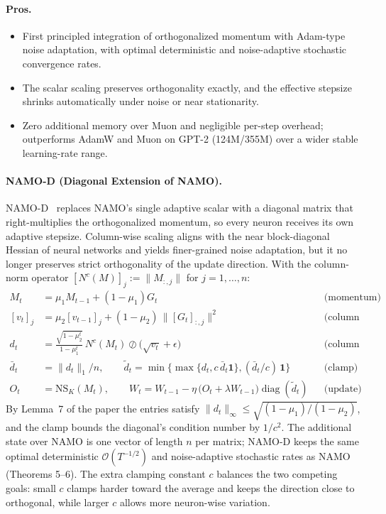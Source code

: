 \paragraph{Pros.}
\begin{itemize}[leftmargin=*]
\item First principled integration of orthogonalized momentum with Adam-type noise
  adaptation, with optimal deterministic and noise-adaptive stochastic convergence
  rates.
\item The scalar scaling preserves orthogonality exactly, and the effective stepsize
  shrinks automatically under noise or near stationarity.
\item Zero additional memory over Muon and negligible per-step overhead; outperforms
  AdamW and Muon on GPT-2 (124M/355M) over a wider stable learning-rate range.
\end{itemize}

\paragraph{NAMO-D (Diagonal Extension of NAMO).}
NAMO-D~\citep{zhang_namo_2026} replaces NAMO's single adaptive scalar with a diagonal
matrix that right-multiplies the orthogonalized momentum, so every neuron receives its
own adaptive stepsize. Column-wise scaling aligns with the near block-diagonal Hessian
of neural networks and yields finer-grained noise adaptation, but it no longer preserves
strict orthogonality of the update direction. With the column-norm operator
$[N^c(M)]_j := \lVert M_{:,j}\rVert$ for $j=1,\dots,n$:
\begin{align}
M_t &= \mu_1 M_{t-1} + (1-\mu_1) G_t && \text{(momentum)} \\
[v_t]_j &= \mu_2 [v_{t-1}]_j + (1-\mu_2)\,\lVert [G_t]_{:,j}\rVert^2 && \text{(column norm EMA)} \\
d_t &= \frac{\sqrt{1-\mu_2^t}}{1-\mu_1^t}\,N^c(M_t) \oslash \bigl(\sqrt{v_t}+\epsilon\bigr) && \text{(column stepsizes)} \\
\bar d_t &= \lVert d_t\rVert_1/n, \qquad
\tilde d_t = \min\bigl\{\max\{d_t, c\,\bar d_t \mathbf 1\}, (\bar d_t/c)\,\mathbf 1\bigr\} && \text{(clamp)} \\
O_t &= \mathrm{NS}_K(M_t), \qquad
W_t = W_{t-1} - \eta\,\bigl(O_t + \lambda W_{t-1}\bigr)\operatorname{diag}(\tilde d_t) && \text{(update)}
\end{align}
By Lemma~7 of the paper the entries satisfy
$\lVert d_t\rVert_\infty \le \sqrt{(1-\mu_1)/(1-\mu_2)}$, and the clamp bounds the
diagonal's condition number by $1/c^2$. The additional state over NAMO is one vector of
length $n$ per matrix; NAMO-D keeps the same optimal deterministic
$\mathcal{O}(T^{-1/2})$ and noise-adaptive stochastic rates as NAMO (Theorems 5--6).
The extra clamping constant $c$ balances the two competing goals: small $c$ clamps
harder toward the average and keeps the direction close to orthogonal, while larger $c$
allows more neuron-wise variation.

